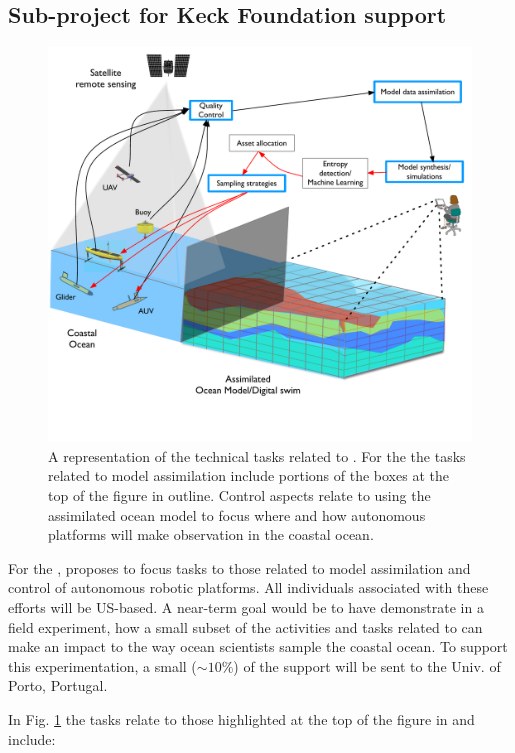 \subsection{Sub-project for Keck Foundation support}

\begin{figure}[H]
  \centering
  \includegraphics[scale=0.6]{fig/Audacious-pilot-block-diag-2.pdf}
  \caption{A representation of the technical tasks related to \proe. For
    the \kck the tasks related to model assimilation include portions of
    the boxes at the top of the figure in {\color{blue}{blue}}
    outline. Control aspects relate to using the assimilated ocean model
    to focus where and how autonomous platforms will make observation in
    the coastal ocean.}
    \label{fig:block-diag}
\end{figure}

For the \kcke, \pro proposes to focus tasks to those related to model
assimilation and control of autonomous robotic platforms. All
individuals associated with these efforts will be US-based. A near-term
goal would be to have demonstrate in a field experiment, how a small
subset of the activities and tasks related to \pro can make an impact to
the way ocean scientists sample the coastal ocean. To support this
experimentation, a small ($\sim 10\%$) of the support will be sent to the
Univ. of Porto, Portugal.

In Fig. \ref{fig:block-diag} the tasks relate to those highlighted at
the top of the figure in {\color{blue}{blue}} and include:

